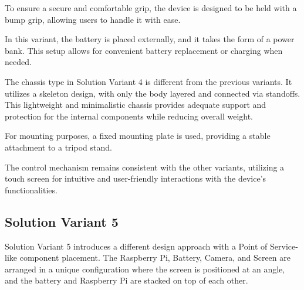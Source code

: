 To ensure a secure and comfortable grip, the device is designed to be held with a bump grip, allowing users to handle it with ease.

In this variant, the battery is placed externally, and it takes the form of a power bank. This setup allows for convenient battery replacement or charging when needed.

The chassis type in Solution Variant 4 is different from the previous variants. It utilizes a skeleton design, with only the body layered and connected via standoffs. This lightweight and minimalistic chassis provides adequate support and protection for the internal components while reducing overall weight.

For mounting purposes, a fixed mounting plate is used, providing a stable attachment to a tripod stand.

The control mechanism remains consistent with the other variants, utilizing a touch screen for intuitive and user-friendly interactions with the device's functionalities.

\subsection{Solution Variant 5}

Solution Variant 5 introduces a different design approach with a Point of Service-like component placement. The Raspberry Pi, Battery, Camera, and Screen are arranged in a unique configuration where the screen is positioned at an angle, and the battery and Raspberry Pi are stacked on top of each other.

